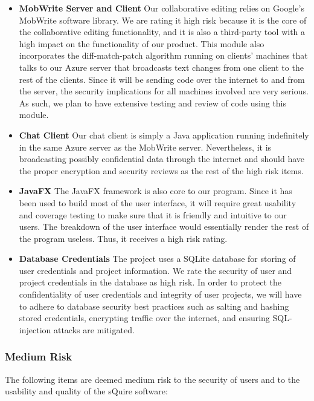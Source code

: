 \documentclass[twoside,letterpaper]{article}
\begin{document}
\begin{itemize}
	\item \textbf{MobWrite Server and Client} 
	Our collaborative editing relies on Google's MobWrite software library. We are rating it high risk because it is the core of the collaborative editing functionality, and it is also a third-party tool with a high impact on the functionality of our product. This module also incorporates the diff-match-patch algorithm running on clients' machines that talks to our Azure server that broadcasts text changes from one client to the rest of the clients. Since it will be sending code over the internet to and from the server, the security implications for all machines involved are very serious. As such, we plan to have extensive testing and review of code using this module.
	\item \textbf{Chat Client} 
	Our chat client is simply a Java application running indefinitely in the same Azure server as the MobWrite server. Nevertheless, it is broadcasting possibly confidential data through the internet and should have the proper encryption and security reviews as the rest of the high risk items.
	\item \textbf{JavaFX} 
	The JavaFX framework is also core to our program. Since it has been used to build most of the user interface, it will require great usability and coverage testing to make sure that it is friendly and intuitive to our users. The breakdown of the user interface would essentially render the rest of the program useless. Thus, it receives a high risk rating.
	\item \textbf{Database Credentials}
	The project uses a SQLite database for storing of user credentials and project information. We rate the security of user and project credentials in the database as high risk. In order to protect the confidentiality of user credentials and integrity of user projects, we will have to adhere to database security best practices such as salting and hashing stored credentials, encrypting traffic over the internet, and ensuring SQL-injection attacks are mitigated.
\end{itemize}

\subsubsection{Medium Risk}

The following items are deemed medium risk to the security of users and to the usability and quality of the sQuire software:
\end{document}
